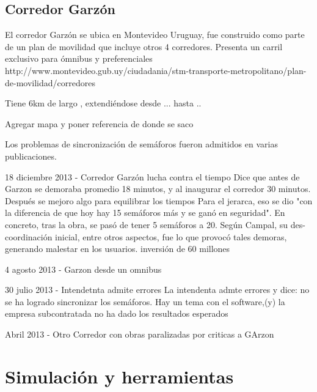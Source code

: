 \subsection{Corredor Garzón}
El corredor Garzón se ubica en Montevideo Uruguay, fue construido como parte de un plan de movilidad que incluye otros 4 corredores. 
Presenta un carril exclusivo para ómnibus y preferenciales
http://www.montevideo.gub.uy/ciudadania/stm-transporte-metropolitano/plan-de-movilidad/corredores

Tiene 6km de largo , extendiéndose desde ...  hasta ..

Agregar mapa y poner referencia de donde se saco

Los problemas de sincronización de semáforos fueron admitidos en varias publicaciones.

18 diciembre 2013 - Corredor Garzón lucha contra el tiempo %
Dice que antes de Garzon se demoraba promedio 18 minutos, y al inaugurar el corredor 30 minutos. Después se mejoro algo para equilibrar los tiempos
Para el jerarca, eso se dio "con la diferencia de que hoy hay 15 semáforos más y se ganó en seguridad". En concreto, tras la obra, se pasó de tener 5 semáforos a 20. Según Campal, su des-coordinación inicial, entre otros aspectos, fue lo que provocó tales demoras, generando malestar en los usuarios.
inversión de 60 millones


4 agosto 2013 - Garzon desde un omnibus %


30 julio 2013  - Intendetnta admite errores %
La intendenta admte errores y dice: no se ha logrado sincronizar los semáforos. Hay un tema con el software,(y) la empresa subcontratada no ha dado los resultados esperados


Abril 2013 - Otro Corredor con obras paralizadas por criticas a GArzon






\section{Simulación y herramientas}

